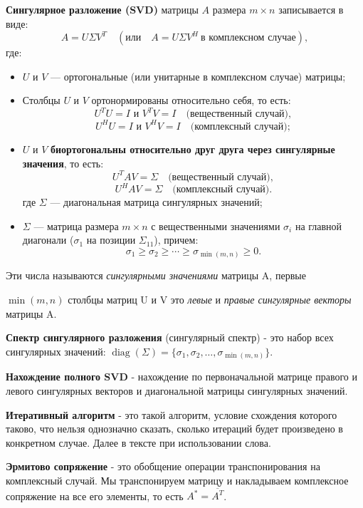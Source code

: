 \hspace{0.45cm} \textbf{Сингулярное разложение (SVD)} матрицы \( A \) размера \( m \times n \) записывается в виде:
\[
A = U \Sigma V^T \quad (\text{или} \quad A = U \Sigma V^H \ \text{в комплексном случае}),
\]
где:
\begin{itemize}
    \item \( U \) и \( V \) — ортогональные (или унитарные в комплексном случае) матрицы;
    \item Столбцы \( U \) и \( V \) ортонормированы относительно себя, то есть:
    \[
    U^T U = I \text{ и } V^T V = I \quad \text{(вещественный случай)},
    \]
    \[
    U^H U = I \text{ и } V^H V = I \quad \text{(комплексный случай)};
    \]
    \item \( U \) и \( V \) \textbf{биортогональны относительно друг друга через сингулярные значения}, то есть:
    \[
    U^T A V = \Sigma \quad \text{(вещественный случай)},
    \]
    \[
    U^H A V = \Sigma \quad \text{(комплексный случай)}.
    \]
    где \( \Sigma \) — диагональная матрица сингулярных значений;
    \item \( \Sigma \) — матрица размера \( m \times n \) с вещественными значениями \( \sigma_i \) на главной диагонали (\( \sigma_1 \) на позиции \( \Sigma_{11} \)), причем:
    \[
    \sigma_1 \geq \sigma_2 \geq \cdots \geq \sigma_{\min(m, n)} \geq 0.
    \]
\end{itemize}

Эти числа называются \textit{сингулярными значениями} матрицы A, первые 

\(\min(m,n)\) столбцы матриц U и V это \textit{левые} и \textit{правые сингулярные векторы} матрицы A.

\textbf{Спектр сингулярного разложения} (сингулярный спектр) - это набор всех сингулярных значений: \( \operatorname{diag}(\Sigma) = \{ \sigma_1, \sigma_2, \dots, \sigma_{\min(m, n)} \} \).

\textbf{Нахождение полного SVD} - нахождение по первоначальной матрице правого и левого сингулярных векторов и диагональной матрицы сингулярных значений. 

\textbf{Итеративный алгоритм} - это такой алгоритм, условие схождения которого таково, что нельзя однозначно сказать, сколько итераций будет произведено в конкретном случае. Далее в тексте при использовании слова. 

\textbf{Эрмитово сопряжение} - это обобщение операции транспонирования на комплексный случай. Мы транспонируем матрицу и накладываем комплексное сопряжение на все его элементы, то есть \(A^*=\overline{A^T}\).

